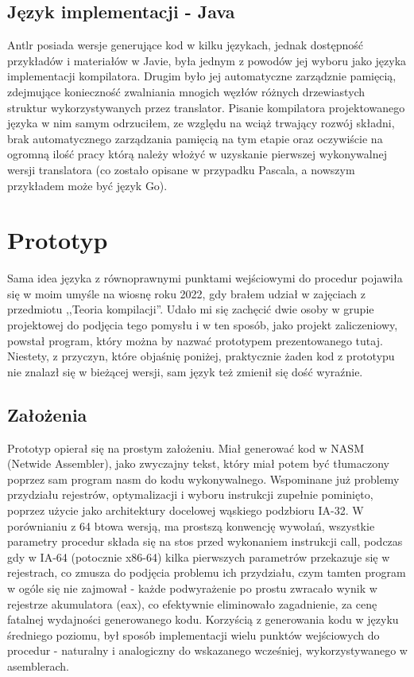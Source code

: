 \subsection{Język implementacji - Java}
Antlr posiada wersje generujące kod w kilku językach, jednak dostępność przykładów i materiałów w Javie, była jednym z powodów jej wyboru jako języka implementacji kompilatora. Drugim było jej automatyczne zarządznie pamięcią, zdejmujące konieczność zwalniania mnogich węzłów różnych drzewiastych struktur wykorzystywanych przez translator. Pisanie kompilatora projektowanego języka w nim samym odrzuciłem, ze względu na wciąż trwający rozwój składni, brak automatycznego zarządzania pamięcią na tym etapie oraz oczywiście na ogromną ilość pracy którą należy włożyć w uzyskanie pierwszej wykonywalnej wersji translatora (co zostało opisane w przypadku Pascala, a nowszym przykładem może być język Go).

\section{Prototyp}
Sama idea języka z równoprawnymi punktami wejściowymi do procedur pojawiła się w moim umyśle na wiosnę roku 2022, gdy brałem udział w zajęciach z przedmiotu ,,Teoria kompilacji''. Udało mi się zachęcić dwie osoby w grupie projektowej do podjęcia tego pomysłu i w ten sposób, jako projekt zaliczeniowy, powstał program, który można by nazwać prototypem prezentowanego tutaj. Niestety, z przyczyn, które objaśnię poniżej, praktycznie żaden kod z prototypu nie znalazł się w bieżącej wersji, sam język też zmienił się dość wyraźnie.

\subsection{Założenia}
Prototyp opierał się na prostym założeniu. Miał generować kod w NASM (Netwide Assembler), jako zwyczajny tekst, który miał potem być tłumaczony poprzez sam program nasm do kodu wykonywalnego. Wspominane już problemy przydziału rejestrów, optymalizacji i wyboru instrukcji zupełnie pominięto, poprzez użycie jako architektury docelowej wąskiego podzbioru IA-32. W porównianiu z 64 btowa wersją, ma prostszą konwencję wywołań, wszystkie parametry procedur składa się na stos przed wykonaniem instrukcji call, podczas gdy w IA-64 (potocznie x86-64) kilka pierwszych parametrów przekazuje się w rejestrach, co zmusza do podjęcia problemu ich przydziału, czym tamten program w ogóle się nie zajmował - każde podwyrażenie po prostu zwracało wynik w rejestrze akumulatora (eax), co efektywnie eliminowało zagadnienie, za cenę fatalnej wydajności generowanego kodu. Korzyścią z generowania kodu w języku średniego poziomu, był sposób implementacji wielu punktów wejściowych do procedur - naturalny i analogiczny do wskazanego wcześniej, wykorzystywanego w asemblerach.

